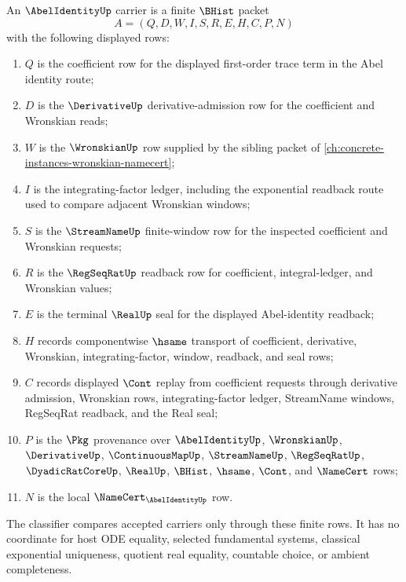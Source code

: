 \begin{definition}
\label{def:abel-identity-carrier}
An $\AbelIdentityUp$ carrier is a finite $\BHist$ packet
$$
A=(Q,D,W,I,S,R,E,H,C,P,N)
$$
with the following displayed rows:
\begin{enumerate}
\item $Q$ is the coefficient row for the displayed first-order trace term in the Abel identity route;
\item $D$ is the $\DerivativeUp$ derivative-admission row for the coefficient and Wronskian reads;
\item $W$ is the $\WronskianUp$ row supplied by the sibling packet of \autoref{ch:concrete-instances-wronskian-namecert};
\item $I$ is the integrating-factor ledger, including the exponential readback route used to compare adjacent Wronskian windows;
\item $S$ is the $\StreamNameUp$ finite-window row for the inspected coefficient and Wronskian requests;
\item $R$ is the $\RegSeqRatUp$ readback row for coefficient, integral-ledger, and Wronskian values;
\item $E$ is the terminal $\RealUp$ seal for the displayed Abel-identity readback;
\item $H$ records componentwise $\hsame$ transport of coefficient, derivative, Wronskian, integrating-factor, window, readback, and seal rows;
\item $C$ records displayed $\Cont$ replay from coefficient requests through derivative admission, Wronskian rows, integrating-factor ledger, StreamName windows, RegSeqRat readback, and the Real seal;
\item $P$ is the $\Pkg$ provenance over $\AbelIdentityUp$, $\WronskianUp$, $\DerivativeUp$, $\ContinuousMapUp$, $\StreamNameUp$, $\RegSeqRatUp$, $\DyadicRatCoreUp$, $\RealUp$, $\BHist$, $\hsame$, $\Cont$, and $\NameCert$ rows;
\item $N$ is the local $\NameCert_{\AbelIdentityUp}$ row.
\end{enumerate}
The classifier compares accepted carriers only through these finite rows. It has no coordinate for host ODE equality, selected fundamental systems, classical exponential uniqueness, quotient real equality, countable choice, or ambient completeness.
\end{definition}


